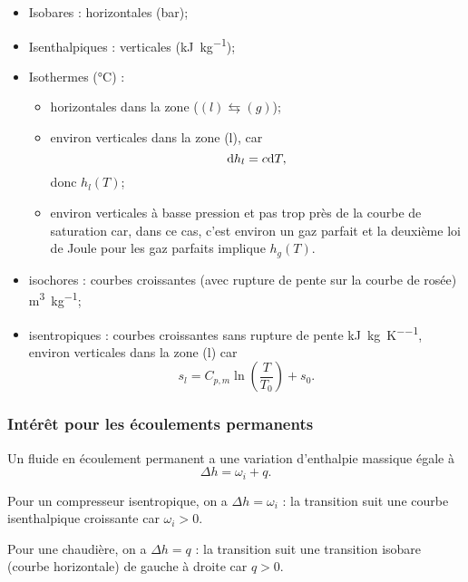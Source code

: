             \begin{itemize}
                \item Isobares : horizontales (\si[]{\bar});
                \item Isenthalpiques : verticales (\si[]{\kilo\joule\per\kilogram});
                \item Isothermes (\si[]{\celsius}) : 
                \begin{itemize}
                    \item horizontales dans la zone ($(l)\leftrightarrows (g)$);
                    \item environ verticales dans la zone (l), car
                    \begin{equation}
                        \mathrm{d} h_l=c\mathrm{d} T,
                    \end{equation}
                    donc $h_l(T)$;
                    \item environ verticales à basse pression et pas trop près de la courbe de saturation car, dans ce cas, c'est environ un gaz parfait et la deuxième loi de Joule pour les gaz parfaits implique $h_g(T)$.
                \end{itemize}
                \item isochores : courbes croissantes (avec rupture de pente sur la courbe de rosée) \si[]{\metre\cubed\per\kilogram};
                \item isentropiques : courbes croissantes sans rupture de pente \si[]{\kilo\joule\per\kilogram\per\kelvin}, environ verticales dans la zone (l) car 
                \begin{equation}
                    s_l=C_{p,m}\ln\left(\frac{T}{T_0}\right)+s_0.
                \end{equation}
            \end{itemize}

        \subsubsection{Intérêt pour les écoulements permanents}

            Un fluide en écoulement permanent a une variation d'enthalpie massique égale à 
            \begin{equation}
                \Delta h=\omega_i+q.
            \end{equation}
            \begin{example}
                Pour un compresseur isentropique, on a $\Delta h=\omega_i$ : la transition suit une courbe isenthalpique croissante car $\omega_i>0$.
            \end{example}
            \begin{example}
                Pour une chaudière, on a $\Delta h=q$ : la transition suit une transition isobare (courbe horizontale) de gauche à droite car $q>0$.
            \end{example}

